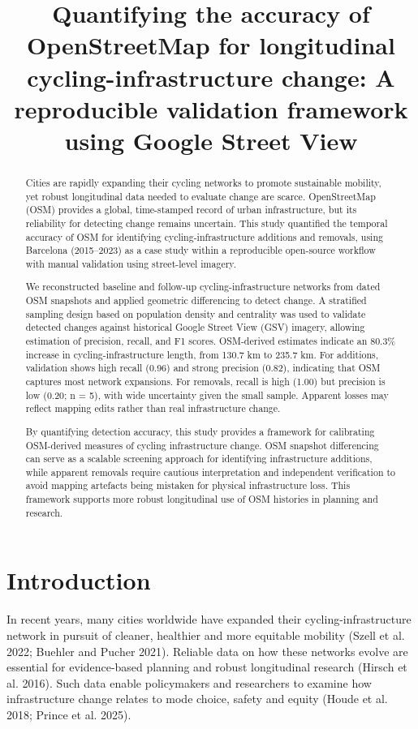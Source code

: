 \documentclass[
]{article}
\title{Quantifying the accuracy of OpenStreetMap for longitudinal
cycling-infrastructure change: A reproducible validation framework using
Google Street View}
\author{}
\date{}
\begin{document}
\maketitle
\begin{abstract}
Cities are rapidly expanding their cycling networks to promote
sustainable mobility, yet robust longitudinal data needed to evaluate
change are scarce. OpenStreetMap (OSM) provides a global, time-stamped
record of urban infrastructure, but its reliability for detecting change
remains uncertain. This study quantified the temporal accuracy of OSM
for identifying cycling-infrastructure additions and removals, using
Barcelona (2015--2023) as a case study within a reproducible open-source
workflow \color{blue}with manual validation using street-level
imagery\color{black}.

We reconstructed baseline and follow-up cycling-infrastructure networks
from dated OSM snapshots and applied geometric differencing to detect
change. A stratified sampling design based on population density and
centrality was used to validate detected changes against historical
Google Street View (GSV) imagery, allowing estimation of precision,
recall, and F1 scores. OSM-derived estimates indicate an 80.3\% increase
in cycling-infrastructure length, from 130.7 km to 235.7 km. For
additions, validation shows high recall (0.96) and strong precision
(0.82), indicating that OSM captures most network expansions. For
removals, recall is high (1.00) but precision is low (0.20;
\color{blue}n = 5), with wide uncertainty given the small
sample\color{black}. Apparent losses may reflect mapping edits rather
than real infrastructure change.

By quantifying detection accuracy, this study provides a framework for
calibrating OSM-derived measures of cycling infrastructure change. OSM
snapshot differencing can serve as a scalable screening approach for
identifying infrastructure additions, while apparent removals require
cautious interpretation and independent verification to avoid mapping
artefacts being mistaken for physical infrastructure loss. This
framework supports more robust longitudinal use of OSM histories in
planning and research.
\end{abstract}


\section{Introduction}\label{introduction}

In recent years, many cities worldwide have expanded their
cycling-infrastructure network in pursuit of cleaner, healthier and more
equitable mobility (Szell et al. 2022; Buehler and Pucher 2021).
Reliable data on how these networks evolve are essential for
evidence-based planning and robust longitudinal research (Hirsch et al.
2016). Such data enable policymakers and researchers to examine how
infrastructure change relates to mode choice, safety and equity (Houde
et al. 2018; Prince et al. 2025).
\end{document}

